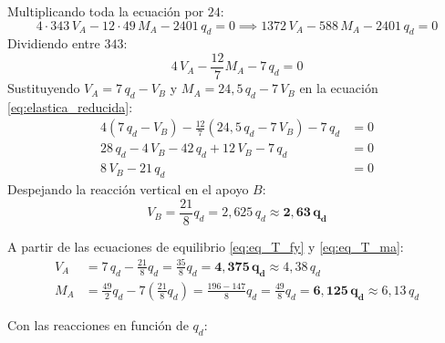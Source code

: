 Multiplicando toda la ecuación por $24$:
\begin{equation}
    4 \cdot 343\,V_A - 12 \cdot 49\,M_A - 2401\,q_d = 0 \implies 1372\,V_A - 588\,M_A - 2401\,q_d = 0
\end{equation}
Dividiendo entre $343$:
\begin{equation}
    4\,V_A - \frac{12}{7}M_A - 7\,q_d = 0
    \label{eq:elastica_reducida}
\end{equation}
Sustituyendo $V_A = 7\,q_d - V_B$ y $M_A = 24{,}5\,q_d - 7\,V_B$ en la ecuación \eqref{eq:elastica_reducida}:
\begin{align}
    4(7\,q_d - V_B) - \frac{12}{7}(24{,}5\,q_d - 7\,V_B) - 7\,q_d & = 0 \nonumber \\
    28\,q_d - 4\,V_B - 42\,q_d + 12\,V_B - 7\,q_d                 & = 0 \nonumber \\
    8\,V_B - 21\,q_d                                              & = 0
\end{align}
Despejando la reacción vertical en el apoyo $B$:
\begin{equation}
    \boxed{V_B = \frac{21}{8}q_d = 2{,}625\,q_d \approx \mathbf{2{,}63\,q_d}}
\end{equation}

A partir de las ecuaciones de equilibrio \eqref{eq:eq_T_fy} y \eqref{eq:eq_T_ma}:
\begin{align}
    V_A & = 7\,q_d - \frac{21}{8}q_d = \frac{35}{8}q_d = \mathbf{4{,}375\,q_d} \approx \boxed{4{,}38\,q_d} \\[6pt]
    M_A & = \frac{49}{2}q_d - 7\left(\frac{21}{8}q_d\right) = \frac{196 - 147}{8}q_d = \frac{49}{8}q_d = \mathbf{6{,}125\,q_d} \approx \boxed{6{,}13\,q_d}
\end{align}



Con las reacciones en función de $q_d$:
